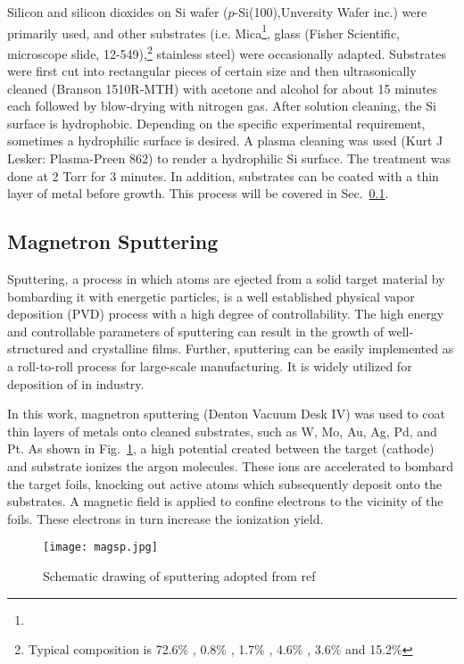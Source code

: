 Silicon and silicon dioxides on Si wafer ($p$-Si(100),Unversity Wafer inc.) were primarily used, and other substrates (i.e. Mica\footnote{ }, glass (Fisher Scientific, microscope slide, 12-549),\footnote{Typical composition is 72.6\% , 0.8\% , 1.7\% , 4.6\% , 3.6\%  and 15.2\% } stainless steel) were occasionally adapted. Substrates were first cut into rectangular pieces of certain size and then ultrasonically cleaned (Branson 1510R-MTH) with acetone and alcohol for about 15 minutes each followed by blow-drying with nitrogen gas. After solution cleaning, the Si surface is hydrophobic. Depending on the specific experimental requirement, sometimes a hydrophilic surface is desired. A plasma cleaning was used (Kurt J Lesker: Plasma-Preen 862) to render a hydrophilic Si surface. The treatment was done at 2 Torr  for 3 minutes. In addition, substrates can be coated with a thin layer of metal before growth. This process will be covered  in Sec.~\ref{sec:mag}.



\subsection{Magnetron Sputtering}\label{sec:mag}

Sputtering, a process in which atoms are ejected from a solid target material by bombarding it with energetic particles, is a well established physical vapor deposition (PVD) process with a high degree of controllability. The high energy and controllable parameters of sputtering can result in the growth of well-structured and crystalline films. Further, sputtering can be easily implemented as a roll-to-roll process for large-scale manufacturing. It is widely utilized for deposition of  in industry.

In this work, magnetron sputtering (Denton Vacuum Desk IV) was used to coat thin layers of metals onto cleaned substrates, such as W, Mo, Au, Ag, Pd, and Pt. As shown in Fig.~\ref{fig:ch2magsp}, a high potential created between the target (cathode) and substrate ionizes the argon molecules. These ions are accelerated to bombard the target foils, knocking out active atoms which subsequently deposit onto the substrates. A magnetic field is applied to confine electrons to the vicinity of the foils. These electrons in turn increase the ionization yield. 

\begin{figure}[htb]
\centering
\texttt{[image: magsp.jpg]}
\caption[magnetron sputtering system]{Schematic drawing of sputtering adopted from ref\cite{Song2008}}
\label{fig:ch2magsp}
\end{figure}

